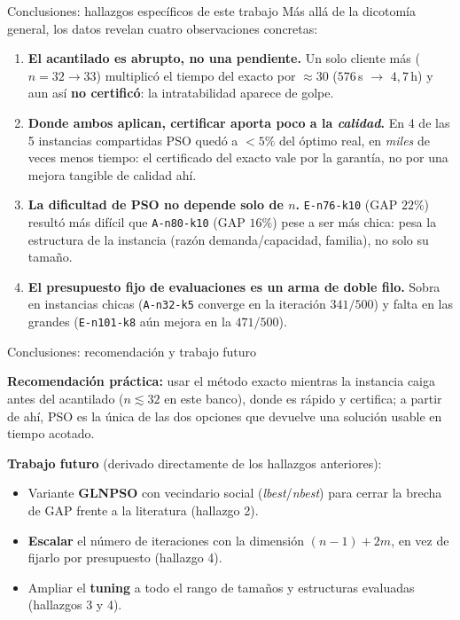 \documentclass[aspectratio=169, 11pt, xcolor={dvipsnames,table}]{beamer}
\newcommand{\azul}[1]{\textcolor{UsachAzul}{#1}}
\newcommand{\naranja}[1]{\textcolor{UsachNaranja}{#1}}
\begin{document}
\begin{frame}{Conclusiones: hallazgos específicos de este trabajo}
\footnotesize
Más allá de la dicotomía general, los datos revelan cuatro observaciones concretas:
\vspace{4pt}
\begin{enumerate}\setlength\itemsep{6pt}
  \item \azul{\textbf{El acantilado es abrupto, no una pendiente.}} Un solo cliente más ($n{=}32\to33$) multiplicó el tiempo del exacto por $\approx 30$ ($576$\,s $\to$ $4{,}7$\,h) y aun así \textbf{no certificó}: la intratabilidad aparece de golpe.
  \item \azul{\textbf{Donde ambos aplican, certificar aporta poco a la \emph{calidad}.}} En 4 de las 5 instancias compartidas PSO quedó a $<5\%$ del óptimo real, en \emph{miles} de veces menos tiempo: el certificado del exacto vale por la garantía, no por una mejora tangible de calidad ahí.
  \item \azul{\textbf{La dificultad de PSO no depende solo de $n$.}} \texttt{E-n76-k10} (GAP $22\%$) resultó más difícil que \texttt{A-n80-k10} (GAP $16\%$) pese a ser más chica: pesa la \naranja{estructura} de la instancia (razón demanda/capacidad, familia), no solo su tamaño.
  \item \azul{\textbf{El presupuesto fijo de evaluaciones es un arma de doble filo.}} Sobra en instancias chicas (\texttt{A-n32-k5} converge en la iteración $341/500$) y falta en las grandes (\texttt{E-n101-k8} aún mejora en la $471/500$).
\end{enumerate}
\end{frame}

\begin{frame}{Conclusiones: recomendación y trabajo futuro}
\begin{ideaclave}
\footnotesize
\textbf{Recomendación práctica:} usar el \azul{método exacto} mientras la instancia caiga antes del acantilado ($n\lesssim 32$ en este banco), donde es rápido y certifica; a partir de ahí, \naranja{PSO} es la única de las dos opciones que devuelve una solución usable en tiempo acotado.
\end{ideaclave}
\vspace{6pt}
\begin{paperbox}
\footnotesize
\textbf{Trabajo futuro} (derivado directamente de los hallazgos anteriores):
\begin{itemize}\setlength\itemsep{4pt}
  \item Variante \textbf{GLNPSO} con vecindario social (\textit{lbest}/\textit{nbest}) para cerrar la brecha de GAP frente a la literatura (hallazgo 2).
  \item \textbf{Escalar} el número de iteraciones con la dimensión $(n{-}1){+}2m$, en vez de fijarlo por presupuesto (hallazgo 4).
  \item Ampliar el \textbf{tuning} a todo el rango de tamaños y estructuras evaluadas (hallazgos 3 y 4).
\end{itemize}
\end{paperbox}
\end{frame}
\end{document}
